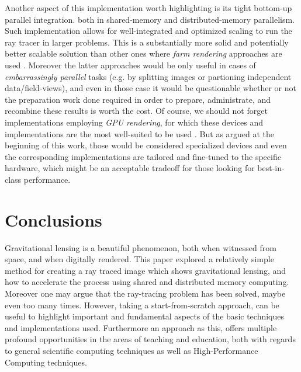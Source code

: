 Another aspect of this implementation worth highlighting is its tight bottom-up parallel integration.
both in shared-memory and distributed-memory parallelism. Such implementation
allows for well-integrated and optimized scaling to run the ray tracer in larger problems.
This is a substantially more solid and potentially better scalable solution than other ones
where \textit{farm rendering} approaches are used \cite{10.1145/3528223.3530171,app112412046}.
Moreover the latter approaches would be only useful in cases of \textit{embarrassingly parallel}
tasks (e.g. by splitting images or partioning independent data/field-views),
and even in those case it would be questionable whether or not the preparation work done required in 
order to prepare, administrate, and recombine these results is worth the cost.
Of course, we should not forget implementations employing \textit{GPU rendering}, for which
these devices and implementations are the most well-suited to be used \cite{Peddie2019_hardware}.
But as argued at the beginning of this work, those would be considered specialized devices
and even the corresponding implementations are tailored and fine-tuned to the specific hardware,
which might be an acceptable tradeoff for those looking for best-in-class performance.



\section{Conclusions}
\label{sec:concl}

Gravitational lensing is a beautiful phenomenon, both when witnessed from space, and when digitally rendered.
This paper explored a relatively simple method for creating a ray traced image which shows gravitational lensing, and how to accelerate the process using shared and distributed memory computing.
Moreover one may argue that the ray-tracing problem has been solved, maybe even too many times.
However, taking a start-from-scratch approach, can be useful to highlight important and fundamental aspects of the basic techniques and implementations used.
Furthermore an approach as this, offers multiple profound opportunities in the areas of teaching and education, both with regards to general scientific computing techniques as well as High-Performance Computing techniques.

